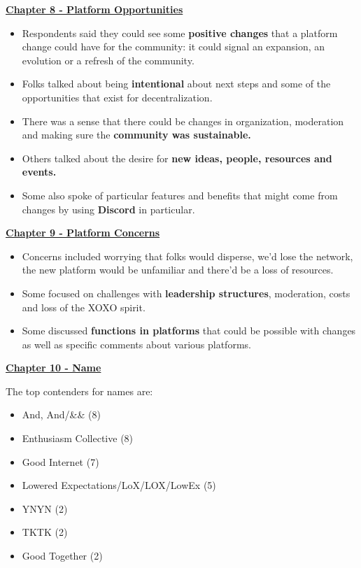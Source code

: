 \documentclass[
]{book}
\providecommand{\tightlist}{%
  \setlength{\itemsep}{0pt}\setlength{\parskip}{0pt}}
\begin{document}
\textbf{\href{https://bduckles.github.io/XOXOReport_BD/platform-opportunities.html}{Chapter 8 - Platform Opportunities}}

\begin{itemize}
\tightlist
\item
  Respondents said they could see some \textbf{positive changes} that a platform change could have for the community: it could signal an expansion, an evolution or a refresh of the community.
\item
  Folks talked about being \textbf{intentional} about next steps and some of the opportunities that exist for decentralization.
\item
  There was a sense that there could be changes in organization, moderation and making sure the \textbf{community was sustainable.}
\item
  Others talked about the desire for \textbf{new ideas, people, resources and events.}
\item
  Some also spoke of particular features and benefits that might come from changes by using \textbf{Discord} in particular.
\end{itemize}

\textbf{\href{https://bduckles.github.io/XOXOReport_BD/platform-concerns.html}{Chapter 9 - Platform Concerns}}

\begin{itemize}
\tightlist
\item
  Concerns included worrying that folks would disperse, we'd lose the network, the new platform would be unfamiliar and there'd be a loss of resources.
\item
  Some focused on challenges with \textbf{leadership structures}, moderation, costs and loss of the XOXO spirit.
\item
  Some discussed \textbf{functions in platforms} that could be possible with changes as well as specific comments about various platforms.
\end{itemize}

\textbf{\href{https://bduckles.github.io/XOXOReport_BD/name.html}{Chapter 10 - Name}}

The top contenders for names are:

\begin{itemize}
\tightlist
\item
  And, And/\&\& (8)
\item
  Enthusiasm Collective (8)
\item
  Good Internet (7)
\item
  Lowered Expectations/LoX/LOX/LowEx (5)
\item
  YNYN (2)
\item
  TKTK (2)
\item
  Good Together (2)
\end{itemize}
\end{document}
